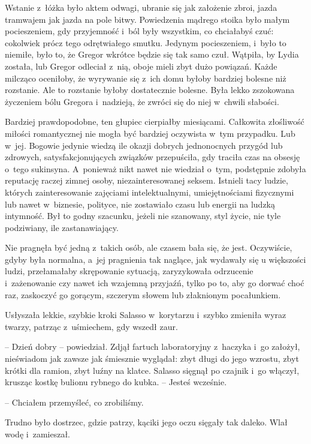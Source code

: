 \documentclass[oneside,polish,12pt,sfheadings]{mwbk}
\begin{document}
Wstanie z~łóżka było aktem odwagi, ubranie się jak założenie zbroi,
jazda tramwajem jak jazda na pole bitwy. Powiedzenia mądrego stoika było
małym pocieszeniem, gdy przyjemność i~ból były wszystkim, co chciałabyś
czuć: cokolwiek prócz tego odrętwiałego smutku. Jedynym pocieszeniem, i~było to niemiłe, było to, że Gregor wkrótce będzie się tak samo czuł.
Wątpiła, by Lydia została, lub Gregor odleciał z~nią, oboje mieli zbyt
dużo powiązań. Każde milcząco oceniłoby, że wyrywanie się z~ich domu
byłoby bardziej bolesne niż rozstanie. Ale to rozstanie byłoby
dostatecznie bolesne. Była lekko zszokowana życzeniem bólu Gregora i~nadzieją, że zwróci się do niej w~chwili słabości.

Bardziej prawdopodobne, ten głupiec cierpiałby miesiącami. Całkowita
złośliwość miłości romantycznej nie mogła być bardziej oczywista w~tym
przypadku. Lub w~jej. Bogowie jedynie wiedzą ile okazji dobrych
jednonocnych przygód lub zdrowych, satysfakcjonujących związków
przepuściła, gdy traciła czas na obsesję o~tego sukinsyna. A~ponieważ
nikt nawet nie wiedział o~tym, podstępnie zdobyła reputację raczej
zimnej osoby, niezainteresowanej seksem. Istnieli tacy ludzie, których
zainteresowanie zajęciami intelektualnymi, umiejętnościami fizycznymi
lub nawet w~biznesie, polityce, nie zostawiało czasu lub energii na
ludzką intymność. Był to godny szacunku, jeżeli nie szanowany, styl
życie, nie tyle podziwiany, ile zastanawiający.

Nie pragnęła być jedną z~takich osób, ale czasem bała się, że jest.
Oczywiście, gdyby była normalna, a~jej pragnienia tak naglące, jak
wydawały się u większości ludzi, przełamałaby skrępowanie sytuacją,
zaryzykowała odrzucenie i~zażenowanie czy nawet ich wzajemną przyjaźń,
tylko po to, aby go dorwać choć raz, zaskoczyć go gorącym, szczerym
słowem lub złaknionym pocałunkiem.

Usłyszała lekkie, szybkie kroki Salasso w~korytarzu i~szybko zmieniła
wyraz twarzy, patrząc z~uśmiechem, gdy wszedł zaur.

-- Dzień dobry -- powiedział. Zdjął fartuch laboratoryjny z~haczyka i~go
założył, nieświadom jak zawsze jak śmiesznie wyglądał: zbyt długi do
jego wzrostu, zbyt krótki dla ramion, zbyt luźny na klatce. Salasso
sięgnął po czajnik i~go włączył, krusząc kostkę bulionu rybnego do
kubka. -- Jesteś wcześnie.

-- Chciałem przemyśleć, co zrobiliśmy.

Trudno było dostrzec, gdzie patrzy, kąciki jego oczu sięgały tak daleko.
Wlał wodę i~zamieszał.
\end{document}
